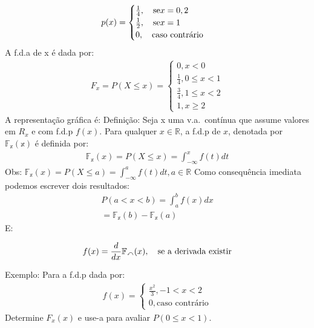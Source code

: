 \documentclass[11pt,a4paper]{book}
\begin{document}
\begin{enumerate}[label=(\alph*)]
\begin{enumerate}
\begin{align*}
  p(x)=
  \begin{cases}
    \frac{1}{4}, \text{\quad se} x=0,2\\
    \frac{1}{2}, \text{\quad se} x=1\\
    0, \text{\quad caso contrário}
  \end{cases}
\end{align*}
A f.d.a de x é dada por:
\begin{align*}
  F_{x}=P(X\le x)= 
  \begin{cases}
    0, x<0 \\
    \frac{1}{4}, 0 \le x <1\\
    \frac{3}{4}, 1 \le x < 2\\
    1, x \geq 2
  \end{cases}
\end{align*}
A representação gráfica é: 
Definição: Seja x uma v.a.\ contínua que assume valores em $R_{x}$ e com 
f.d.p $f(x)$. Para qualquer $x \in \mathbb{R}$, a f.d.p de $x$, denotada por 
$\mathbb{F_{x}(x)}$ é definida por: 
\begin{align}
  \mathbb{F_{x}}(x)= P(X \le x)= \int_{- \infty}^{x} f(t)dt 
\end{align}
Obs: $\mathbb{F_{x}}(x)= P(X \le a)= \int_{-\infty}^{a} f(t)dt , a \in \mathbb{R}$
Como consequência imediata podemos escrever dois resultados: 
\begin{align}
  P(a <x<b)= \int_{a}^{b} f(x)dx\\
  = \mathbb{F_{x}}(b)-\mathbb{F_{x}}(a)
\end{align}
E: 

\begin{align}
  f(x)=\frac{d}{dx}\mathbb{F_{x}}(x), \text{\quad se a derivada existir}
\end{align}

Exemplo: Para a f.d.p dada por: 
\begin{align*}
  f(x)= 
  \begin{cases}
    \frac{x^2}{3}, -1 < x < 2 \\
    0, \text{caso contrário}
  \end{cases}
\end{align*}
Determine $F_{x}(x)$ e use-a para avaliar $P(0 \le x< 1)$.


\end{enumerate}
\end{enumerate}
\end{document}
